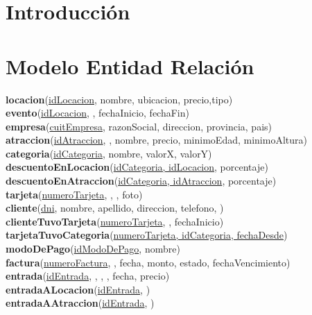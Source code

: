 \documentclass[10pt,a4paper]{article}
\begin{document}


\maketitle

\newpage

\tableofcontents

\newpage

\section{Introducción}

\newpage

\section{Modelo Entidad Relación}

\textbf{locacion}(\underline{idLocacion}, nombre, ubicacion, precio,tipo) \\
\textbf{evento}(\underline{idLocacion}, , fechaInicio, fechaFin) \\
\textbf{empresa}(\underline{cuitEmpresa}, razonSocial, direccion, provincia, pais) \\
\textbf{atraccion}(\underline{idAtraccion}, , nombre, precio, minimoEdad, minimoAltura) \\
\textbf{categoria}(\underline{idCategoria}, nombre, valorX, valorY) \\
\textbf{descuentoEnLocacion}(\underline{idCategoria, idLocacion}, porcentaje) \\
\textbf{descuentoEnAtraccion}(\underline{idCategoria, idAtraccion}, porcentaje) \\
\textbf{tarjeta}(\underline{numeroTarjeta}, , , foto) \\
\textbf{cliente}(\underline{dni}, nombre, apellido, direccion, telefono, ) \\
\textbf{clienteTuvoTarjeta}(\underline{numeroTarjeta}, , fechaInicio) \\
\textbf{tarjetaTuvoCategoria}(\underline{numeroTarjeta, idCategoria, fechaDesde}) \\
\textbf{modoDePago}(\underline{idModoDePago}, nombre) \\
\textbf{factura}(\underline{numeroFactura}, , fecha, monto, estado, fechaVencimiento) \\
\textbf{entrada}(\underline{idEntrada}, , , , fecha, precio) \\
\textbf{entradaALocacion}(\underline{idEntrada}, ) \\
\textbf{entradaAAtraccion}(\underline{idEntrada}, ) \\
\end{document}
